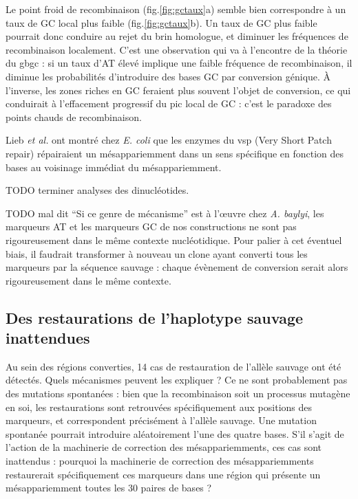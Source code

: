Le point froid de recombinaison (fig.\ref{fig:gctaux}a) semble bien correspondre
à un taux de GC local plus faible (fig.\ref{fig:gctaux}b). Un taux de GC plus
faible pourrait donc conduire au rejet du brin homologue, et diminuer les
fréquences de recombinaison localement. C'est une observation qui va à
l'encontre de la théorie du \ac{gbgc} : si un taux d'AT élevé implique une
faible fréquence de recombinaison, il diminue les probabilités d'introduire des
bases GC par conversion génique. À l'inverse, les zones riches en GC feraient
plus souvent l'objet de conversion, ce qui conduirait à l'effacement progressif
du pic local de GC : c'est le paradoxe des points chauds de
recombinaison\cite{coop_live_2007}.

Lieb \emph{et al.}\cite{lieb_recombination_1985} ont montré chez \emph{E. coli}
que les enzymes du \ac{vsp} (Very Short Patch repair) répairaient un
mésappariemment dans un sens spécifique en fonction des bases au voisinage
immédiat du mésappariemment.

TODO terminer analyses des dinucléotides.

TODO mal dit ``Si ce genre de mécanisme'' est à l'œuvre chez \emph{A. baylyi},
les marqueurs AT et les marqueurs GC de nos constructions ne sont pas
rigoureusement dans le même contexte nucléotidique. Pour palier à cet éventuel
biais, il faudrait transformer à nouveau un clone ayant converti tous les
marqueurs par la séquence sauvage : chaque évènement de conversion serait alors
rigoureusement dans le même contexte.

\subsection{Des restaurations de l'haplotype sauvage inattendues}
\label{subsub:discu-restaur}

Au sein des régions converties, 14 cas de restauration de l'allèle sauvage ont
été détectés. Quels mécanismes peuvent les expliquer ? Ce ne sont probablement
pas des mutations spontanées : bien que la recombinaison soit un processus
mutagène en soi\cite{rodgers_error-prone_2016,hicks_increased_2010}, les
restaurations sont retrouvées spécifiquement aux positions des marqueurs, et
correspondent précisément à l'allèle sauvage. Une mutation spontanée pourrait
introduire aléatoirement l'une des quatre bases. S'il s'agit de l'action de la
machinerie de correction des mésappariemments, ces cas sont inattendus :
pourquoi la machinerie de correction des mésappariemments restaurerait
spécifiquement ces marqueurs dans une région qui présente un mésappariemment
toutes les 30 paires de bases ?

